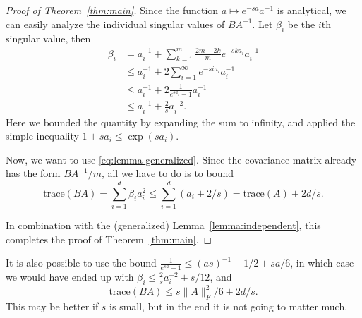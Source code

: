 \documentclass[11pt]{article}
\newcommand{\tr}{\mathrm{trace}}
\begin{document}
\begin{proof}[Proof of Theorem~\ref{thm:main}]
Since the function $a\mapsto e^{-s a}a^{-1}$ is analytical, we 
can easily analyze the individual singular values of $BA^{-1}$.
Let $\beta_i$ be the $i$th singular value, then
\begin{align}
    \beta_i
    &= 
    a_i^{-1}
    +
    \sum_{k=1}^{m}
    \frac{2m-2k}{m}
    e^{-s k a_i}
    a_i^{-1}
    \nonumber\\&\le
    a_i^{-1}
    +
    2
    \sum_{i=1}^\infty
    e^{-s i a_i}
    a_i^{-1}
    \nonumber\\&\le
    a_i^{-1}
    +
    2
    \frac{1}{e^{s a_i} - 1}
    a_i^{-1}
    \nonumber\\&\le
    a_i^{-1}
    +
    \frac{2}{s}
    a_i^{-2}
    .
    \label{eq:bi-bound}
\end{align}
Here we bounded the quantity by expanding the sum to infinity, and applied the simple inequality $1+s a_i \le \exp(s a_i)$.
%

Now, we want to use \eqref{eq:lemma-generalized}.
Since the covariance matrix already has the form $BA^{-1}/m$, all we have to do is to bound 
\[
    \tr(BA)
    =
    \sum_{i=1}^d \beta_i a_i^2
    \le
    \sum_{i=1}^d (a_i + 2/s)
    =
    \tr(A) + 2d/s
    .
\]

In combination with the (generalized) Lemma~\ref{lemma:independent}, this completes the proof of Theorem~\ref{thm:main}.
\end{proof}

It is also possible to use the bound 
$\frac{1}{e^{s a}-1} \le (as)^{-1} - 1/2 + sa/6$,
in which case we would have ended up with $\beta_i \le \frac{2}{s}a_i^{-2} + s/12$, 
and 
\[\tr(BA) \le s\|A\|_F^2/6 + 2d/s.\]
This may be better if $s$ is small, but in the end it is not going to matter much.





\end{document}
